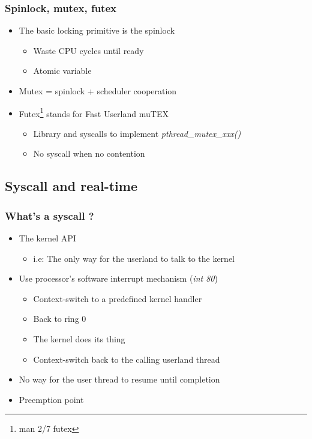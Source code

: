 \begin{frame}
  \frametitle{Spinlock, mutex, futex}

  \begin{itemize}
  \item The basic locking primitive is the spinlock
    \begin{itemize}
    \item Waste CPU cycles until ready
    \item Atomic variable
    \end{itemize}
  \item Mutex = spinlock + scheduler cooperation
  \item Futex\footnote{man 2/7 futex} stands for Fast Userland muTEX
    \begin{itemize}
    \item Library and syscalls to implement \emph{pthread\_mutex\_xxx()}
    \item No syscall when no contention
    \end{itemize}
  \end{itemize}
\end{frame}

\subsection{Syscall and real-time}
\label{subsec:rt}


\begin{frame}
  \frametitle{What's a syscall ?}

  \begin{itemize}
  \item The kernel API
    \begin{itemize}
    \item i.e: The only way for the userland to talk to the kernel
    \end{itemize}
  \item Use processor's software interrupt mechanism (\emph{int 80})
    \begin{itemize}
    \item Context-switch to a predefined kernel handler
    \item Back to ring 0
    \item The kernel does its thing
    \item Context-switch back to the calling userland thread
    \end{itemize}
  \item No way for the user thread to resume until completion
  \item Preemption point
  \end{itemize}
\end{frame}

